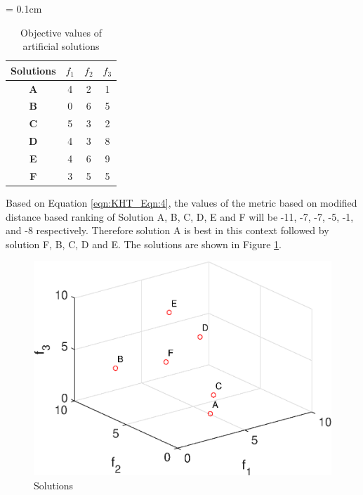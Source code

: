 \documentclass{sig-alternate}
\begin{document}
\begin{itemize}
	\begin{table}[!htb]\scriptsize
		\centering
		\renewcommand{\arraystretch}{0.9}
		\caption{Objective values of artificial solutions}
		\label{tab:Drexample}
		\tabcolsep = 0.1cm
		\begin{tabular}{|c|c|c|c|}
		\hline
		\textbf{Solutions} & \textbf{$f_1$} & \textbf{$f_2$} & \textbf{$f_3$} \\ \hline
		\textbf{A}         & 4              & 2              & 1              \\ \hline
		\textbf{B}         & 0              & 6              & 5              \\ \hline
		\textbf{C}         & 5              & 3              & 2              \\ \hline
		\textbf{D}         & 4              & 3              & 8              \\ \hline
		\textbf{E}         & 4              & 6              & 9              \\ \hline
		\textbf{F}         & 3              & 5              & 5              \\ \hline
		\end{tabular}
	\end{table}

	Based on Equation \ref{eqn:KHT_Eqn:4}, the values of the metric based on modified distance based ranking of Solution A, B, C, D, E and F will be -11, -7, -7, -5, -1, and -8 respectively. Therefore solution A is best in this context followed by solution F, B, C, D and E. The solutions are shown in Figure \ref{fig:drexp}.
	
	\begin{figure}[!htb]
		\centering
		\includegraphics[width=.4\textwidth]{Figures/drexp.eps}
		\caption{Solutions}
		\label{fig:drexp}
	\end{figure}
	

\end{itemize}
\end{document}
